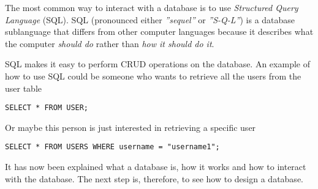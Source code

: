 The most common way to interact with a database is to use \textit{Structured Query Language} (SQL).
SQL (pronounced either \textit{''sequel''} or \textit{''S-Q-L''}) is a database sublanguage that differs from other computer languages because it describes what the computer \textit{should do} rather than \textit{how it should do it}.\cite{SQLIntroduction}

SQL makes it easy to perform CRUD operations on the database.\cite{OracleWhatIsDatabase}
An example of how to use SQL could be someone who wants to retrieve all the users from the user table

\begin{lstlisting}
SELECT * FROM USER;
\end{lstlisting}

Or maybe this person is just interested in retrieving a specific user

\begin{lstlisting}
SELECT * FROM USERS WHERE username = "username1";
\end{lstlisting}

It has now been explained what a database is, how it works and how to interact with the database.
The next step is, therefore, to see how to design a database.


